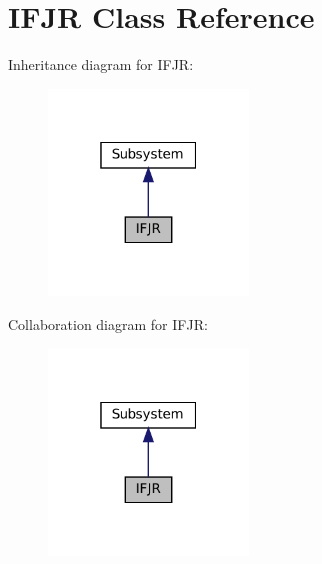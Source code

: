 \hypertarget{class_i_f_j_r}{}\section{I\+F\+JR Class Reference}
\label{class_i_f_j_r}


Inheritance diagram for I\+F\+JR\+:\nopagebreak
\begin{figure}[H]
\begin{center}
\leavevmode
\includegraphics[width=151pt]{class_i_f_j_r__inherit__graph}
\end{center}
\end{figure}


Collaboration diagram for I\+F\+JR\+:\nopagebreak
\begin{figure}[H]
\begin{center}
\leavevmode
\includegraphics[width=151pt]{class_i_f_j_r__coll__graph}
\end{center}
\end{figure}
